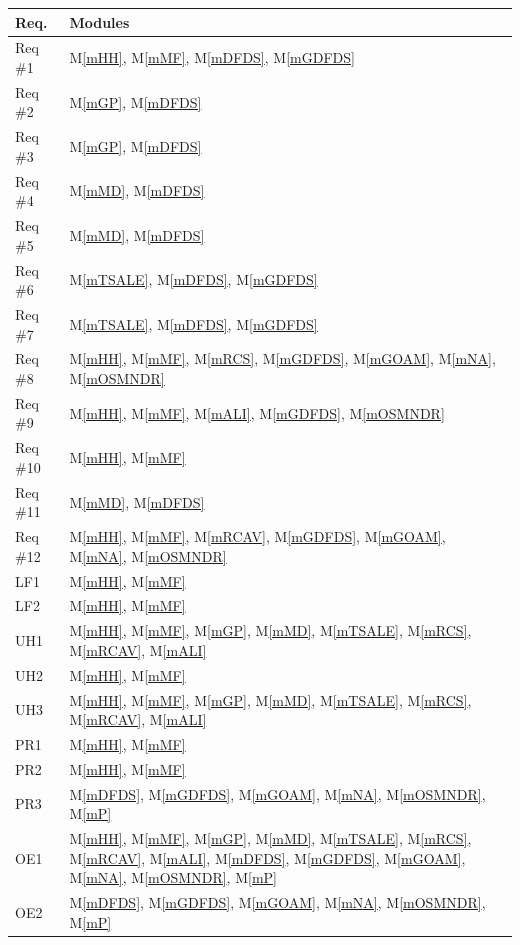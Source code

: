 \documentclass[12pt, titlepage]{article}
\newcommand{\mref}[1]{M\ref{#1}}
\begin{document}
\begin{table}[H]
\centering
\begin{tabular}{p{} p{}}
\toprule
\textbf{Req.} & \textbf{Modules}\\
\midrule
Req \#1 & \mref{mHH}, \mref{mMF}, \mref{mDFDS}, \mref{mGDFDS}\\
Req \#2 & \mref{mGP}, \mref{mDFDS}\\
Req \#3 & \mref{mGP}, \mref{mDFDS}\\
Req \#4 & \mref{mMD}, \mref{mDFDS}\\
Req \#5 & \mref{mMD}, \mref{mDFDS}\\
Req \#6 & \mref{mTSALE}, \mref{mDFDS}, \mref{mGDFDS}\\
Req \#7 & \mref{mTSALE}, \mref{mDFDS}, \mref{mGDFDS}\\
Req \#8 & \mref{mHH}, \mref{mMF},  \mref{mRCS}, \mref{mGDFDS}, \mref{mGOAM}, \mref{mNA}, \mref{mOSMNDR}\\
Req \#9 & \mref{mHH}, \mref{mMF},  \mref{mALI}, \mref{mGDFDS}, \mref{mOSMNDR}\\
Req \#10 & \mref{mHH}, \mref{mMF}\\
Req \#11 & \mref{mMD}, \mref{mDFDS}\\
Req \#12 & \mref{mHH}, \mref{mMF},  \mref{mRCAV}, \mref{mGDFDS}, \mref{mGOAM}, \mref{mNA}, \mref{mOSMNDR}\\
LF1 & \mref{mHH}, \mref{mMF}\\
LF2 & \mref{mHH}, \mref{mMF}\\
UH1 & \mref{mHH}, \mref{mMF}, \mref{mGP}, \mref{mMD}, \mref{mTSALE}, \mref{mRCS}, \mref{mRCAV}, \mref{mALI}\\
UH2 & \mref{mHH}, \mref{mMF}\\
UH3 & \mref{mHH}, \mref{mMF}, \mref{mGP}, \mref{mMD}, \mref{mTSALE}, \mref{mRCS}, \mref{mRCAV}, \mref{mALI}\\
PR1 & \mref{mHH}, \mref{mMF}\\
PR2 & \mref{mHH}, \mref{mMF}\\
PR3 & \mref{mDFDS}, \mref{mGDFDS}, \mref{mGOAM}, \mref{mNA}, \mref{mOSMNDR}, \mref{mP}\\
OE1 & \mref{mHH}, \mref{mMF}, \mref{mGP}, \mref{mMD}, \mref{mTSALE}, \mref{mRCS}, \mref{mRCAV}, \mref{mALI}, \mref{mDFDS}, \mref{mGDFDS}, \mref{mGOAM}, \mref{mNA}, \mref{mOSMNDR}, \mref{mP}\\
OE2 & \mref{mDFDS}, \mref{mGDFDS}, \mref{mGOAM}, \mref{mNA}, \mref{mOSMNDR}, \mref{mP}\\

\end{tabular}
\end{table}
\end{document}
